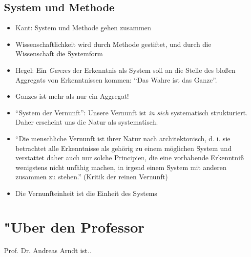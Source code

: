\documentclass[emulatestandardclasses]{scrartcl}
\begin{document}
\subsection{System und Methode}

\begin{itemize}
  \item Kant: System und Methode gehen zusammen
  \item Wissenschaftlichkeit wird durch Methode gestiftet, und durch die Wissenschaft die Systemform
  \item Hegel: Ein \emph{Ganzes} der Erkenntnis als System soll an die Stelle des bloßen Aggregats von Erkenntnissen kommen: "`Das Wahre ist das Ganze"'.
  \item Ganzes ist mehr als nur ein Aggregat!
  \item "`System der Vernunft"': Unsere Vernunft ist \emph{in sich} systematisch strukturiert. Daher erscheint uns die Natur als systematisch.
  \item "`Die menschliche Vernunft ist ihrer Natur nach architektonisch, d. i. sie	 betrachtet alle Erkenntnisse als gehörig zu einem möglichen System und	 verstattet daher auch nur solche Principien, die eine vorhabende Erkenntniß wenigstens nicht unfähig machen, in irgend einem System mit anderen	zusammen zu stehen."' (Kritik der reinen Vernunft)
  \item Die Vernunfteinheit ist die Einheit des Systems
\end{itemize}


\newpage
\section{"Uber den Professor}
Prof. Dr. Andreas Arndt ist..


\end{document}
